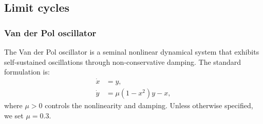 \documentclass{article}
\theoremstyle{definition} \newtheorem{definition}{Definition}  \newtheorem{example}{Example}
\theoremstyle{remark} \newtheorem{remark}{Remark}
\newcounter{ct}
\begin{document}
\subsection{Limit cycles}
\subsubsection{Van der Pol oscillator}
The Van der Pol oscillator is a seminal nonlinear dynamical system that exhibits self-sustained oscillations through non-conservative damping\citep{vanderpol1926relaxation}.
The standard formulation is:
\begin{equation}
\begin{aligned}
\dot{x} &= y, \\
\dot{y} &= \mu (1 - x^2) y - x,
\end{aligned}
\end{equation}
where $\mu > 0$ controls the nonlinearity and damping. 
Unless otherwise specified, we set $\mu=0.3$.

\end{document}
